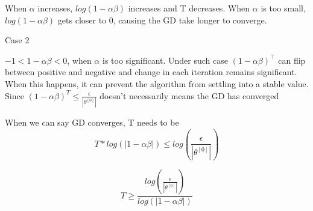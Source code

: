 \begin{answer}
When $\alpha$ increases, $log(1- \alpha\beta)$ increases and T decreases. 
When $\alpha$ is too small, $log(1 - \alpha\beta)$ gets closer to 0, causing the GD take longer to converge.

Case 2 

$ -1 < 1-\alpha\beta < 0$, when $\alpha$ is too significant. Under such case $(1 - \alpha\beta)^\top$ can flip between positive and negative and change in each iteration remains significant. When this happens,  it can prevent the algorithm from settling into a stable value. Since $(1 - \alpha \beta) ^ T \le \frac{\epsilon}{|\theta ^{[0]}|}$ doesn't necessarily means the GD has converged

When we can say GD converges, T needs to be 
\begin{equation*}
    T*log(|1- \alpha\beta|) \le log(\frac{\epsilon}{|\theta ^{[0]}|})
\end{equation*}

\begin{equation*}
	 T \ge \frac{log(\frac{\epsilon}{|\theta ^{[0]}|})}{log(|1- \alpha\beta|)} 
\end{equation*}

\end{answer}

